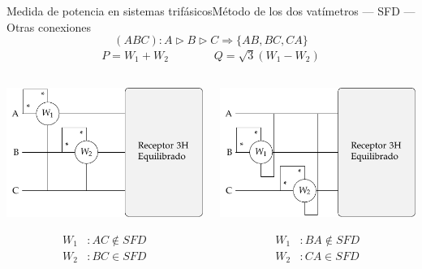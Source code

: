 \documentclass[aspectratio=169, xcolor={usenames,svgnames,dvipsnames}]{beamer}
\begin{document}
\begin{frame}{Medida de potencia en sistemas trifásicos}{Método de los dos vatímetros --- SFD --- Otras conexiones}
\[
  \boxed{(ABC): A \triangleright B \triangleright C \Longrightarrow \{AB, BC, CA\}}
\]
\begin{align*}
  P = W_1 + W_2\qquad \qquad Q = \sqrt{3}(W_1 - W_2)
\end{align*}
\begin{columns}
\begin{column}{0.33\columnwidth}
\begin{center}
\includegraphics[width=.8\linewidth]{../figs/Potencia_3H_equilibrado_AB.pdf}
\end{center}
\begin{align*}
  W_1&: AC \notin SFD\\
  W_2&: BC \in SFD
\end{align*}
\end{column}
\begin{column}{0.33\columnwidth}
\begin{center}
\includegraphics[width=.8\linewidth]{../figs/Potencia_3H_equilibrado_BC.pdf}
\end{center}
\begin{align*}
  W_1&: BA \notin SFD\\
  W_2&: CA \in SFD
\end{align*}
\end{column}


\end{columns}
\end{frame}
\end{document}
